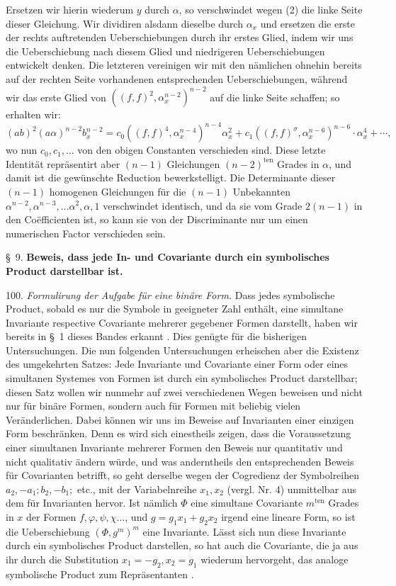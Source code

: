 \documentclass[11pt]{article}
\providecommand{\weberpage}[1]{}
\let\Phi\varPhi
\begin{document}
Ersetzen wir hierin wiederum $y$ durch $\alpha$, so verschwindet wegen
(2) die linke Seite dieser Gleichung. Wir dividiren alsdann dieselbe
durch $\alpha_x$ und ersetzen die erste der rechts auftretenden Ueberschiebungen
durch ihr erstes Glied, indem wir uns die Ueberschiebung nach diesem
Glied und niedrigeren Ueberschiebungen entwickelt denken. Die letzteren
vereinigen wir mit den nämlichen ohnehin bereits auf der rechten
Seite vorhandenen entsprechenden Ueberschiebungen, während wir das
erste Glied von $((f,f)^2, \alpha_x^{n-2})^{n-2}$ auf die linke Seite schaffen; so erhalten
 wir:
\[
(ab)^2(a\alpha)^{n-2}b_x^{n-2} = c_0\left((f,f)^4,\alpha_x^{n-4}\right)^{n-4}\alpha_x^2 + c_1\left((f,f)^\sigma,\alpha_x^{n-6}\right)^{n-6}\cdot\alpha_x^4 + \cdots,
\]
wo nun $c_0, c_1, \ldots$ von den obigen Constanten verschieden sind. Diese
letzte Identität repräsentirt aber $(n-1)$ Gleichungen $(n-2)^{\text{ten}}$ Grades
in $\alpha$, und damit ist die gewünschte Reduction bewerkstelligt. Die
Determinante dieser $(n-1)$ homogenen Gleichungen für die $(n-1)$
Unbekannten $\alpha^{n-2}, \alpha^{n-3}, \ldots \alpha^2, \alpha, 1$ verschwindet identisch, und
da sie vom Grade $2(n-1)$ in den Co\"efficienten ist, so kann sie von
der Discriminante nur um einen numerischen Factor verschieden sein.


\weberpage{110}
\S~9. \textbf{Beweis, dass jede In- und Covariante durch ein symbolisches
Product darstellbar ist.}

100. \textit{Formulirung der Aufgabe für eine binäre Form.} Dass jedes
symbolische Product, sobald es nur die Symbole in geeigneter Zahl
enthält, eine simultane Invariante respective Covariante mehrerer gegebener
 Formen darstellt, haben wir bereits in \S~1 dieses Bandes erkannt
. Dies genügte für die bisherigen Untersuchungen. Die nun
folgenden Untersuchungen erheischen aber die Existenz des umgekehrten
 Satzes: Jede Invariante und Covariante einer Form oder eines
simultanen Systemes von Formen ist durch ein symbolisches Product
darstellbar; diesen Satz wollen wir nunmehr auf zwei verschiedenen
Wegen beweisen und nicht nur für binäre Formen, sondern auch für
Formen mit beliebig vielen Veränderlichen. Dabei können wir uns
im Beweise auf Invarianten einer einzigen Form beschränken. Denn
es wird sich einestheils zeigen, dass die Voraussetzung einer simultanen
Invariante mehrerer Formen den Beweis nur quantitativ und nicht
qualitativ ändern würde, und was anderntheils den entsprechenden Beweis
 für Covarianten betrifft, so geht derselbe wegen der Cogredienz
der Symbolreihen $a_2, -a_1; b_2, -b_1;$ etc., mit der Variabelnreihe $x_1,
x_2$ (vergl. Nr. 4) unmittelbar aus dem für Invarianten hervor. Ist
nämlich $\Phi$ eine simultane Covariante $m^{\text{ten}}$ Grades in $x$ der Formen
$f, \varphi, \psi, \chi \ldots$, und $g = g_1x_1 + g_2x_2$ irgend eine lineare Form, so ist
die Ueberschiebung $(\Phi, g^m)^m$ eine Invariante. Lässt sich nun diese Invariante
 durch ein symbolisches Product darstellen, so hat auch die
Covariante, die ja aus ihr durch die Substitution $x_1 = -g_2, x_2 = g_1$
wiederum hervorgeht, das analoge symbolische Product zum Repräsentanten
.
\end{document}

